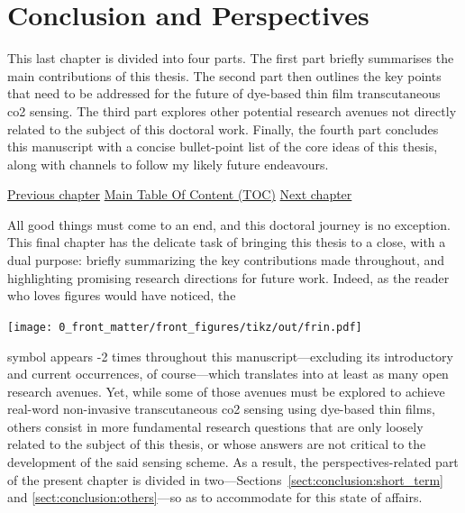 \chapter{Conclusion and Perspectives}\label{chap:conclusion}

\begin{tldrbox}
	
	This last chapter is divided into four parts. The first part briefly summarises the main contributions of this thesis. The second part then outlines the key points that need to be addressed for the future of dye-based thin film transcutaneous \gls{co2} sensing. The third part explores other potential research avenues not directly related to the subject of this doctoral work. Finally, the fourth part concludes this manuscript with a concise bullet-point list of the core ideas of this thesis, along with channels to follow my likely future endeavours.
	
	\tcblower
	
	\hyperref[chap:thin_film]{Previous chapter} \hfill \hyperref[chapter:toc]{Main Table Of Content (TOC)} \hfill \hyperref[chap:biblio]{Next chapter}

\end{tldrbox}

All good things must come to an end, and this doctoral journey is no exception. This final chapter has the delicate task of bringing this thesis to a close, with a dual purpose: briefly summarizing the key contributions made throughout, and highlighting promising research directions for future work. Indeed, as the reader who loves figures would have noticed, the
\begin{center} \texttt{[image: 0\_front\_matter/front\_figures/tikz/out/frin.pdf]}
\end{center}
\noindent{}symbol appears \the\numexpr\value{mfrincounter}-2\relax{} times throughout this manuscript---excluding its introductory and current occurrences, of course---which translates into at least as many open research avenues. Yet, while some of those avenues must be explored to achieve real-word non-invasive transcutaneous \gls{co2} sensing using dye-based thin films, others consist in more fundamental research questions that are only loosely related to the subject of this thesis, or whose answers are not critical to the development of the said sensing scheme. As a result, the perspectives-related part of the present chapter is divided in two---Sections~\ref{sect:conclusion:short_term} and \ref{sect:conclusion:others}---so as to accommodate for this state of affairs.

